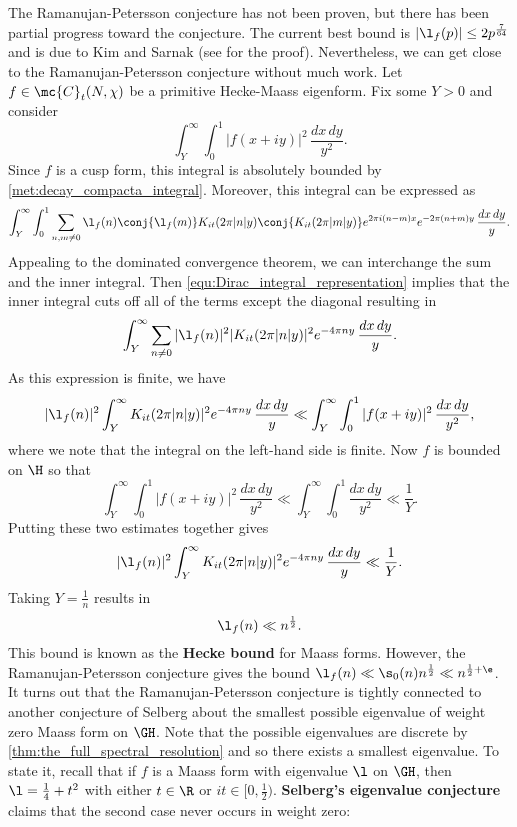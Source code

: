     The Ramanujan-Petersson conjecture has not been proven, but there has been partial progress toward the conjecture. The current best bound is $|\l_{f}(p)| \le 2p^{\frac{7}{64}}$ and is due to Kim and Sarnak (see \cite{kim2003functoriality} for the proof). Nevertheless, we can get close to the Ramanujan-Petersson conjecture without much work. Let $f \in \mc{C}_{t}(N,\chi)$ be a primitive Hecke-Maass eigenform. Fix some $Y > 0$ and consider
    \[
      \int_{Y}^{\infty}\int_{0}^{1}|f(x+iy)|^{2}\,\frac{dx\,dy}{y^{2}}.
    \]
    Since $f$ is a cusp form, this integral is absolutely bounded by \cref{met:decay_compacta_integral}.
    Moreover, this integral can be expressed as
    \[
      \int_{Y}^{\infty}\int_{0}^{1}\sum_{n,m \neq 0}\l_{f}(n)\conj{\l_{f}(m)}K_{it}(2\pi|n|y)\conj{K_{it}(2\pi|m|y)}e^{2\pi i(n-m)x}e^{-2\pi(n+m)y}\,\frac{dx\,dy}{y}.
    \]
    Appealing to the dominated convergence theorem, we can interchange the sum and the inner integral. Then \cref{equ:Dirac_integral_representation} implies that the inner integral cuts off all of the terms except the diagonal resulting in
    \[
      \int_{Y}^{\infty}\sum_{n \neq 0}|\l_{f}(n)|^{2}|K_{it}(2\pi|n|y)|^{2}e^{-4\pi ny}\,\frac{dx\,dy}{y}.
    \]
    As this expression is finite, we have
    \[
      |\l_{f}(n)|^{2}\int_{Y}^{\infty}K_{it}(2\pi|n|y)|^{2}e^{-4\pi ny}\,\frac{dx\,dy}{y} \ll \int_{Y}^{\infty}\int_{0}^{1}|f(x+iy)|^{2}\,\frac{dx\,dy}{y^{2}},
    \]
    where we note that the integral on the left-hand side is finite. Now $f$ is bounded on $\H$ so that
    \[
      \int_{Y}^{\infty}\int_{0}^{1}|f(x+iy)|^{2}\,\frac{dx\,dy}{y^{2}} \ll \int_{Y}^{\infty}\int_{0}^{1}\frac{dx\,dy}{y^{2}} \ll \frac{1}{Y}.
    \]
    Putting these two estimates together gives
    \[
      |\l_{f}(n)|^{2}\int_{Y}^{\infty}K_{it}(2\pi|n|y)|^{2}e^{-4\pi ny}\,\frac{dx\,dy}{y} \ll \frac{1}{Y}.
    \]
    Taking $Y = \frac{1}{n}$ results in
    \[
      \l_{f}(n) \ll n^{\frac{1}{2}}.
    \]
    This bound is known as the \textbf{Hecke bound} for Maass forms. However, the Ramanujan-Petersson conjecture gives the bound $\l_{f}(n) \ll \s_{0}(n)n^{\frac{1}{2}} \ll n^{\frac{1}{2}+\e}$. It turns out that the Ramanujan-Petersson conjecture is tightly connected to another conjecture of Selberg about the smallest possible eigenvalue of weight zero Maass form on $\GH$. Note that the possible eigenvalues are discrete by \cref{thm:the_full_spectral_resolution} and so there exists a smallest eigenvalue. To state it, recall that if $f$ is a Maass form with eigenvalue $\l$ on $\GH$, then $\l = \frac{1}{4}+t^{2}$ with either $t \in \R$ or $it \in [0,\frac{1}{2})$. \textbf{Selberg's eigenvalue conjecture} claims that the second case never occurs in weight zero:

